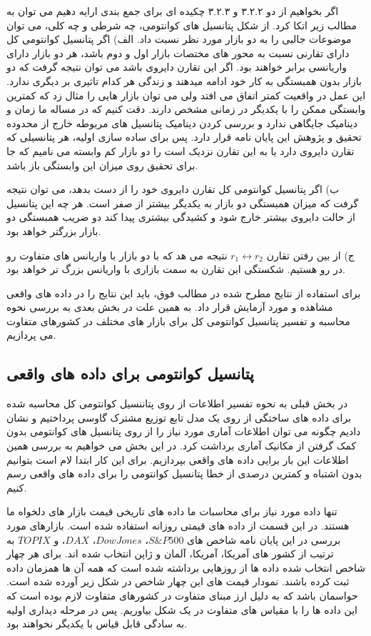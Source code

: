 \documentclass[a4paper,titlepage,12pt,fleqn,oneside]{report}
\begin{document}
	اگر بخواهیم از دو ۳.۲.۲ و ۳.۲.۳ چکیده ای برای جمع بندی ارايه دهیم می توان به مطالب زیر اتکا کرد.
	از شکل پتانسیل های کوانتومی، چه شرطی و چه کلی، می توان موضوعات جالبی را به دو بازار مورد نظر نسبت داد. 
	الف) اگر پتانسیل کوانتومی کل دارای تقارنی نسبت به محور های مختصات بازار اول و دوم باشد، هر دو بازار دارای واریانسی برابر خواهند بود. اگر این تقارن دایروی باشد می توان نتیجه گرفت که دو بازار بدون همبستگی به کار خود ادامه  میدهند و زندگی هر کدام تاثیری بر دیگری ندارد. این عمل در واقعیت کمتر اتفاق می افتد ولی می توان بازار هایی را مثال زد که کمترین وابستگی ممکن را با یکدیگر در زمانی مشخص دارند. دقت کنیم که در مساله ما زمان و دینامیک جایگاهی ندارد و بررسی کردن دینامیک پتانسیل های مربوطه خارج از محدوده تحقیق و پژوهش این پایان نامه قرار دارد. پس برای ساده سازی اولیه، هر پتانسیلی که تقارن دایروی دارد یا به این تقارن نزدیک است را دو بازار کم وابسته می نامیم که جا برای تحقیق روی میزان این وابستگی باز باشد. 
	
	ب) اگر پتانسیل کوانتومی کل تقارن دایروی خود را از دست بدهد، می توان نتیجه گرفت که میزان همبستگی دو بازار به یکدیگر بیشتر از صفر است. هر چه این پتانسیل از حالت دایروی بیشتر خارج شود و کشیدگی بیشتری پیدا کند دو ضریب همبستگی دو بازار بزرگتر خواهد بود. 
	
	ج) از بین رفتن تقارن 
	$r_1 \leftrightarrow r_2$
	نتیجه می هد که با دو بازار با واریانس های متفاوت رو در رو هستیم. شکستگی این تقارن به سمت بازاری با واریانس بزرگ تر خواهد بود. 
	
	برای استفاده از نتایج مطرح شده در مطالب فوق، باید این نتایج را در داده های واقعی مشاهده و مورد آزمایش قرار داد. به همین علت در بخش بعدی به بررسی نحوه محاسبه و تفسیر پتانسیل کوانتومی کل برای بازار های مختلف در کشورهای متفاوت می پردازیم. 
	\newpage
	\subsection{پتانسیل کوانتومی برای داده های واقعی}
	در بخش قبلی به نحوه تفسیر اطلاعات از روی پتاننسیل کوانتومی کل محاسبه شده برای داده های ساختگی از روی یک مدل تابع توزیع مشترک گاوسی پرداختیم و نشان دادیم چگونه می توان اطلاعات آماری مورد نیاز را از روی پتانسیل های کوانتومی بدون کمک گرفتن از مکانیک آماری برداشت کرد. در این بخش می خواهیم به بررسی همین اطلاعات این بار برایی داده های واقعی بپردازیم. برای این کار ابتدا لام است بتوانیم بدون اشتباه و کمترین درصدی از خطا پتانسیل کوانتومی را برای داده های واقعی رسم کنیم. 
	
	تنها داده مورد نیاز برای محاسبات ما داده های تاریخی قیمت بازار های دلخواه ما هستند. در این قسمت از داده های قیمتی روزانه استفاده شده است. بازارهای مورد بررسی در این پایان نامه شاخص های 
	$S\&P500$، 
	$Dow Jones$، 
	$DAX$،
	و 
	$TOPIX$
	به ترتیب از کشور های آمریکا، آمریکا، آلمان و ژاپن انتخاب شده اند. برای هر چهار شاخص انتخاب شده داده ها از روزهایی برداشته شده است که همه آن ها همزمان داده ثبت کرده باشند. نمودار قیمت های این چهار شاخص در شکل زیر آورده شده است. حواسمان باشد که به دلیل ارز مبنای متفاوت در کشورهای متفاوت لازم بوده است که این داده ها را با مقیاس های متفاوت در یک شکل بیاوریم. پس در مرحله دیداری اولیه به سادگی قابل قیاس با یکدیگر نخواهند بود. 
	
\end{document}
